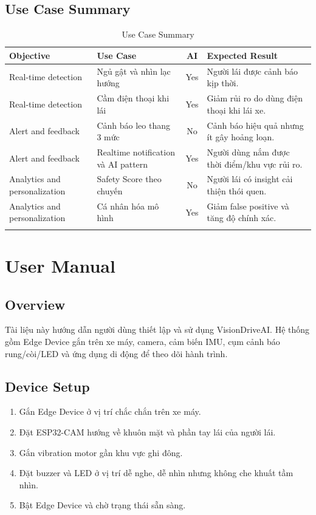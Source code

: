 \documentclass[12pt,a4paper]{article}
\begin{document}
\subsection{Use Case Summary}

\begin{longtable}{|P{3.2cm}|P{4cm}|c|P{5.2cm}|}
\hline
\textbf{Objective} & \textbf{Use Case} & \textbf{AI} & \textbf{Expected Result} \\
\hline
Real-time detection & Ngủ gật và nhìn lạc hướng & Yes & Người lái được cảnh báo kịp thời. \\
\hline
Real-time detection & Cầm điện thoại khi lái & Yes & Giảm rủi ro do dùng điện thoại khi lái xe. \\
\hline
Alert and feedback & Cảnh báo leo thang 3 mức & No & Cảnh báo hiệu quả nhưng ít gây hoảng loạn. \\
\hline
Alert and feedback & Realtime notification và AI pattern & Yes & Người dùng nắm được thời điểm/khu vực rủi ro. \\
\hline
Analytics and personalization & Safety Score theo chuyến & No & Người lái có insight cải thiện thói quen. \\
\hline
Analytics and personalization & Cá nhân hóa mô hình & Yes & Giảm false positive và tăng độ chính xác. \\
\hline
\caption{Use Case Summary}
\end{longtable}

\newpage
\section{User Manual}

\subsection{Overview}

Tài liệu này hướng dẫn người dùng thiết lập và sử dụng VisionDriveAI. Hệ thống gồm Edge Device gắn trên xe máy, camera, cảm biến IMU, cụm cảnh báo rung/còi/LED và ứng dụng di động để theo dõi hành trình.

\subsection{Device Setup}

\begin{enumerate}
    \item Gắn Edge Device ở vị trí chắc chắn trên xe máy.
    \item Đặt ESP32-CAM hướng về khuôn mặt và phần tay lái của người lái.
    \item Gắn vibration motor gần khu vực ghi đông.
    \item Đặt buzzer và LED ở vị trí dễ nghe, dễ nhìn nhưng không che khuất tầm nhìn.
    \item Bật Edge Device và chờ trạng thái sẵn sàng.
\end{enumerate}
\end{document}
